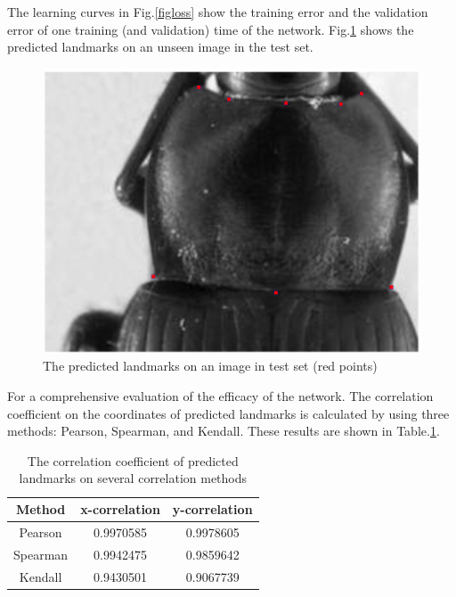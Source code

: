 \documentclass[conference]{IEEEtran}
\begin{document}
The learning curves in Fig.\ref{figloss} show the training error and the validation error of one training (and validation) time of the network. Fig.\ref{figrsexample} shows the predicted landmarks on an unseen image in the test set.

\begin{figure}[htbp]
	\centerline{\includegraphics[scale=0.18]{images/plandmark}}
	\caption{The predicted landmarks on an image in test set (red points)}
	\label{figrsexample}
\end{figure}
For a comprehensive evaluation of the efficacy of the network. The correlation coefficient on the coordinates of predicted landmarks is calculated by using three methods: Pearson\cite{pallant2013spss}, Spearman\cite{myers2010research}, and Kendall\cite{kendall1938new}. These results are shown in Table.\ref{tab1}.
\begin{table}[htbp]
\caption{The correlation coefficient of predicted landmarks on several correlation methods}
\begin{center}
\begin{tabular}{|c|c|c|}
\hline
\textbf{Method} & \textbf{x-correlation} & \textbf{y-correlation} \\ \hline
Pearson & 0.9970585 & 0.9978605 \\ \hline
Spearman & 0.9942475 & 0.9859642 \\ \hline
Kendall & 0.9430501 & 0.9067739 \\ \hline
\end{tabular}
\label{tab1}
\end{center}
\end{table}
\end{document}
